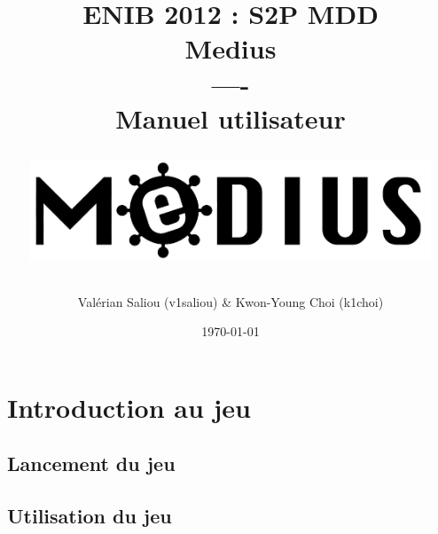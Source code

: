 \documentclass{article}
\title{{\Huge \bf ENIB 2012 : S2P  MDD} \\
\vspace*{2cm}
{\Huge \bf Medius} \\----\\ Manuel utilisateur \\
\vspace*{2cm}
\centerline{\includegraphics[height=3cm]{logomedius.jpg}}
}
\author{Valérian Saliou (v1saliou) \& Kwon-Young Choi (k1choi)}
\date\today
\begin{document}
\maketitle

\newpage

\section{Introduction au jeu}

\subsection{Lancement du jeu}


\subsection{Utilisation du jeu}
\end{document}
